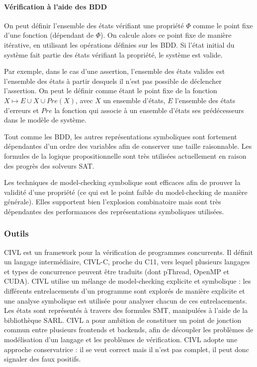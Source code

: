 \paragraph{Vérification à l'aide des BDD}

On peut définir l'ensemble des états vérifiant une propriété \(\Phi\)
comme le point fixe d'une fonction (dépendant de \(\Phi\)). On calcule
alors ce point fixe de manière itérative, en utilisant les opérations définies
sur les BDD. Si l'état initial du système fait partie des états vérifiant la
propriété, le système est valide.

Par exemple, dans le cas d'une assertion, l'ensemble des états valides est
l'ensemble des états à partir desquels il n'est pas possible de déclencher
l'assertion. On peut le définir comme étant le point fixe de la fonction \(X
\mapsto E \cup X \cup Pre(X)\), avec \(X\) un ensemble d'états, \(E\) l'ensemble
des états d'erreurs et \(Pre\) la fonction qui associe à un ensemble d'états ses
prédécesseurs dans le modèle de système.

Tout comme les BDD, les autres représentations symboliques sont fortement
dépendantes d'un ordre des variables afin de conserver une taille
raisonnable. Les formules de la logique propositionnelle sont très
utilisées actuellement en raison des progrès des solveurs SAT.

Les techniques de model-checking symbolique sont efficaces afin de
prouver la validité d'une propriété (ce qui est le point faible du
model-checking de manière générale). Elles supportent bien l'explosion
combinatoire mais sont très dépendantes des performances des
représentations symboliques utilisées.

\subsubsection{Outils}

CIVL\cite{CIVL} est un framework pour la vérification de programmes concurrents.
Il définit un langage intermédiaire, CIVL-C, proche du C11, vers lequel plusieurs
langages et types de concurrence peuvent être traduits (dont pThread, OpenMP et
CUDA). CIVL utilise un mélange de model-checking explicite et symbolique : les
différents entrelacements d'un programme sont explorés de manière explicite et
une analyse symbolique est utilisée pour analyser chacun de ces entrelacements.
Les états sont représentés à travers des formules SMT, manipulées à l'aide de la
bibliothèque SARL\cite{SARL}. CIVL a pour ambition de constituer un point de
jonction commun entre plusieurs frontends et backends, afin de découpler les
problèmes de modélisation d'un langage et les problèmes de vérification. CIVL
adopte une approche conservatrice : il se veut correct mais il n'est pas
complet, il peut donc signaler des faux positifs.

